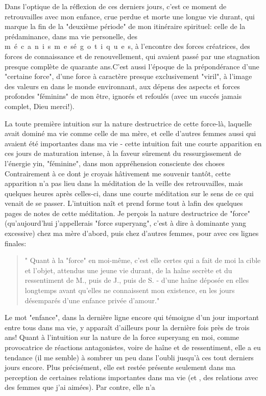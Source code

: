

Dans l'optique de la réflexion de ces derniers jours, c'est ce moment de retrouvailles avec mon enfance, crue perdue et morte une longue vie durant, qui marque la fin de la "deuxième période" de mon itinéraire spirituel: celle de la prédaminance, dans ma vie personelle, des \mbox{m é c a n i s m e s}\quad\mbox{é g o t i q u e s}, à l'encontre des forces créatrices, des forces de connaissance et de renouvellement, qui avaient passé par une stagnation presque complète de quarante ans.C'est aussi l'époque de la prépondérance d'une "certaine force", d'une force à caractère presque exclusivement "viril", à l'image des valeurs en  dans le monde environnant, aux dépens des aspects et forces profondes "féminins" de mon être, ignorés et refoulés (avec un succés jamais complet, Dieu merci!).

La toute première intuition sur la nature destructrice de cette force-là, laquelle avait dominé ma vie comme celle de ma mère, et celle d'autres femmes aussi qui avaient été importantes dans ma vie - cette intuition fait une courte apparition en ces jours de maturation intense, à la faveur sûrement du ressurgissement de l'énergie yin, "féminine", dans mon appréhension consciente des choses Contrairement à ce dont je croyais hâtivement me souvenir tantôt, cette apparition n'a pas lieu dans la méditation de la veille des retrouvailles, mais quelques heures après celles-ci, dans une courte méditation sur le sens de ce qui venait de se passer. L'intuition naît et prend forme tout à lafin des quelques pages de notes de cette méditation. Je perçois la nature destructrice de  "force" (qu'aujourd'hui j'appellerais "force superyang", c'est à dire à dominante yang excessive) chez ma mère d'abord, puis chez d'autres femmes, pour  avec ces lignes finales:

\begin{quote}
" Quant à la "force" en moi-même, c'est elle certes qui a fait de moi la cible et l'objet, attendus une jeune vie durant, de la haîne secrète et du ressentiment de M., puis de J., puis de S. - d'une haîne déposée en elles longtemps avant qu'elles ne connaissent mon existence, en les jours désemparés d'une enfance privée d'amour."
\end{quote}

Le mot "enfance", dans la dernière ligne encore qui témoigne d'un jour important entre tous dans ma vie, y apparaît d'ailleurs pour la dernière fois  près de trois ans! Quant à l'intuition sur la nature de la force superyang en moi, comme provocatrice de réactions antagonistes, voire de haîne et de ressentiment, elle a eu tendance (il me semble) à sombrer un peu dans l'oubli jusqu'à ces tout derniers jours encore. Plus précisément, elle est restée présente seulement dans ma perception de certaines relations importantes dans ma vie (et , des relations avec des femmes que j'ai aimées). Par contre, elle n'a 

